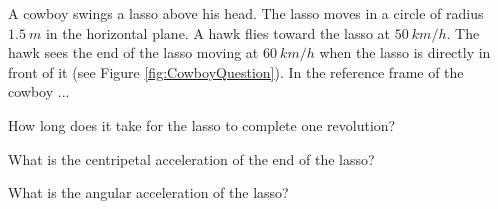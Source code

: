 \begin{problemParts}{A cowboy swings a lasso above his head. The lasso moves in a circle of radius $\SI{1.5}{m}$ in the horizontal plane. A hawk flies toward the lasso at $\SI{50}{km/h}$. The hawk sees the end of the lasso moving at $\SI{60}{km/h}$ when the lasso is directly in front of it (see Figure \ref{fig:CowboyQuestion}). In the reference frame of the cowboy ...\label{Q:cowboy}}
\item How long does it take for the lasso to complete one revolution?
\item What is the centripetal acceleration of the end of the lasso? 
\item What is the angular acceleration of the lasso?
\end{problemParts} 

\newpage
